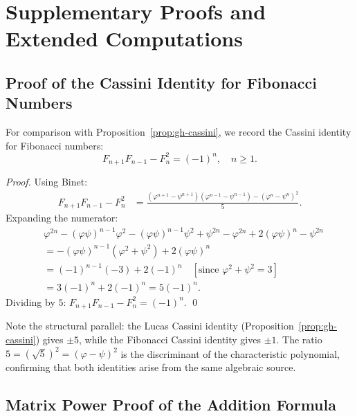 \section{Supplementary Proofs and Extended Computations}
\label{sec:gh-supplementary}

\subsection{Proof of the Cassini Identity for Fibonacci Numbers}
\label{subsec:gh-cassini-fib}

For comparison with Proposition~\ref{prop:gh-cassini},
we record the Cassini identity for Fibonacci numbers:
\begin{equation}\label{eq:gh-cassini-fib}
  F_{n+1} F_{n-1} - F_n^2 = (-1)^n, \quad n \geq 1.
\end{equation}
\begin{proof}
Using Binet:
\begin{align*}
  F_{n+1}F_{n-1} - F_n^2
  &= \frac{(\varphi^{n+1}-\psi^{n+1})(\varphi^{n-1}-\psi^{n-1})
          - (\varphi^n-\psi^n)^2}{5}.
\end{align*}
Expanding the numerator:
\begin{align*}
  & \varphi^{2n} - (\varphi\psi)^{n-1}\varphi^2
    - (\varphi\psi)^{n-1}\psi^2 + \psi^{2n}
    - \varphi^{2n} + 2(\varphi\psi)^n - \psi^{2n} \\
  &= -(\varphi\psi)^{n-1}(\varphi^2+\psi^2) + 2(\varphi\psi)^n \\
  &= (-1)^{n-1}(-3) + 2(-1)^n \quad [\text{since }\varphi^2+\psi^2=3] \\
  &= 3(-1)^n + 2(-1)^n = 5(-1)^n.
\end{align*}
Dividing by \(5\): \(F_{n+1}F_{n-1} - F_n^2 = (-1)^n\).
\qed
\end{proof}

\noindent Note the structural parallel: the Lucas Cassini identity
(Proposition~\ref{prop:gh-cassini}) gives \(\pm 5\),
while the Fibonacci Cassini identity gives \(\pm 1\).
The ratio \(5 = (\sqrt{5})^2 = (\varphi-\psi)^2\) is the
discriminant of the characteristic polynomial, confirming
that both identities arise from the same algebraic source.

\subsection{Matrix Power Proof of the Addition Formula}
\label{subsec:gh-matrix-addition}

